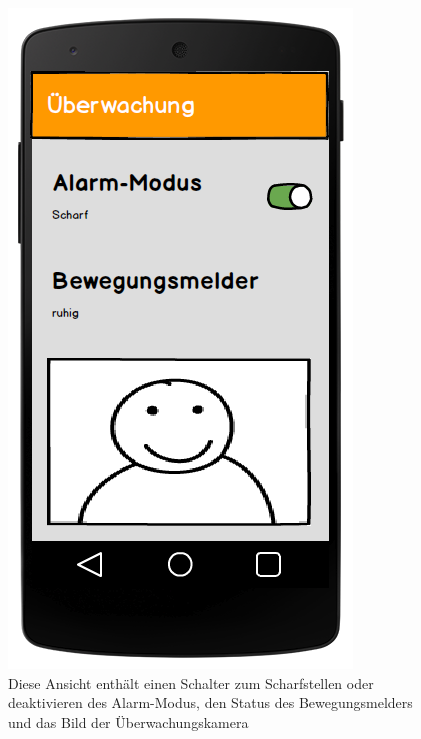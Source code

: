 \begin{figure}[H]
	\centering
		\includegraphics[scale=0.3]{report/img/mockup_camera.png}
	\caption{Diese Ansicht enthält einen Schalter zum Scharfstellen oder deaktivieren des Alarm-Modus, den Status des Bewegungsmelders und das Bild der Überwachungskamera}
	\label{fig:mockupCamera}
\end{figure}

